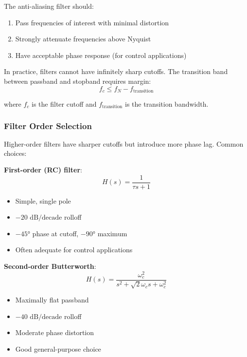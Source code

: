 The anti-aliasing filter should:
\begin{enumerate}
    \item Pass frequencies of interest with minimal distortion
    \item Strongly attenuate frequencies above Nyquist
    \item Have acceptable phase response (for control applications)
\end{enumerate}

In practice, filters cannot have infinitely sharp cutoffs. The transition band between passband and stopband requires margin:
\begin{equation}
f_c \leq f_N - f_{\text{transition}}
\label{eq:filter_cutoff}
\end{equation}

where $f_c$ is the filter cutoff and $f_{\text{transition}}$ is the transition bandwidth.

\subsubsection{Filter Order Selection}

Higher-order filters have sharper cutoffs but introduce more phase lag. Common choices:

\textbf{First-order (RC) filter}:
\begin{equation}
H(s) = \frac{1}{\tau s + 1}
\label{eq:first_order_aa}
\end{equation}
\begin{itemize}
    \item Simple, single pole
    \item $-20\text{ dB/decade}$ rolloff
    \item $-45°$ phase at cutoff, $-90°$ maximum
    \item Often adequate for control applications
\end{itemize}

\textbf{Second-order Butterworth}:
\begin{equation}
H(s) = \frac{\omega_c^2}{s^2 + \sqrt{2}\omega_c s + \omega_c^2}
\label{eq:butterworth_aa}
\end{equation}
\begin{itemize}
    \item Maximally flat passband
    \item $-40\text{ dB/decade}$ rolloff
    \item Moderate phase distortion
    \item Good general-purpose choice
\end{itemize}

